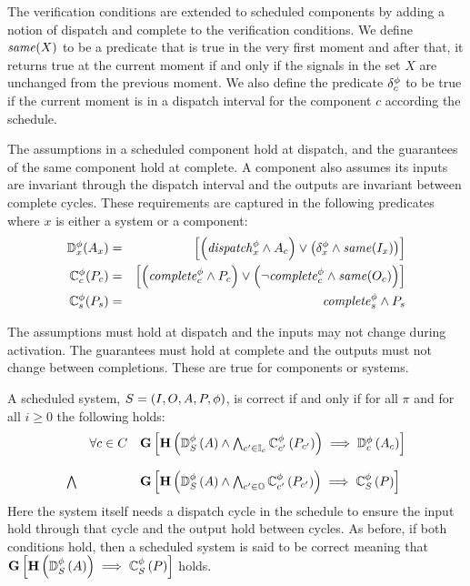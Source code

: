 The verification conditions are extended to scheduled components by adding a notion of dispatch and complete to the verification conditions.
We define $\mathit{same}(X)$ to be a predicate that is true in the very first moment and after that, it returns true at the current moment if and only if the signals in the set $X$ are unchanged from the previous moment.
We also define the predicate $\delta^\phi_c$ to be true if the current moment is in a dispatch interval for the component $c$ according the schedule.

The assumptions in a scheduled component hold at dispatch, and the guarantees of the same component hold at complete.
A component also assumes its inputs are invariant through the dispatch interval and the outputs are invariant between complete cycles.
These requirements are captured in the following predicates where $x$ is either a system or a component:
\begin{eqnarray*}
  \mathbb{D}^\phi_x(A_x) &=& \left[\left(\mathit{dispatch}^{\phi}_x \wedge A_c\right) \vee \left(\delta^\phi_x \wedge \mathit{same}(I_x)\right)\right] \\
  \mathbb{C}^\phi_c(P_c) &=& \left[\left(\mathit{complete}^{\phi}_c \wedge P_c\right) \vee \left(\neg\mathit{complete}^{\phi}_c \wedge \mathit{same}(O_c)\right)\right] \\
  \mathbb{C}^\phi_s(P_s) &=& \mathit{complete}^{\phi}_s \wedge P_s
\end{eqnarray*}

The assumptions must hold at dispatch and the inputs may not change during activation.
The guarantees must hold at complete and the outputs must not change between completions.
These are true for components or systems.

A scheduled system, $S = (I, O, A, P, \phi)$, is correct if and only if for all $\pi$ and for all $i \ge 0$ the following holds:
\[
\begin{array}{lll}
        & \forall c \in C &  
            \mathbf{G}\left[\mathbf{H}\left(\mathbb{D}^\phi_S\left(A\right) \wedge 
            \bigwedge_{c^\prime \in \mathbb{I}_c} \mathbb{C}^\phi_{c^\prime}\left(P_{c^\prime}\right)\right) 
            \implies \mathbb{D}^\phi_c\left(A_c\right)\right] \\ \\
 \bigwedge &   & 
            \mathbf{G}\left[\mathbf{H}\left(\mathbb{D}^\phi_S\left(A\right) \wedge 
            \bigwedge_{c^\prime \in \mathbb{O}} \mathbb{C}^\phi_{c^\prime}\left(P_{c^\prime}\right)\right)
            \implies \mathbb{C}^\phi_{S}\left(P\right)\right]
\end{array}
\]
Here the system itself needs a dispatch cycle in the schedule to ensure the input hold through that cycle and the output hold between cycles. As before, if both conditions hold, then a scheduled system is said to be correct meaning that $\mathbf{G}\left[\mathbf{H}\left(\mathbb{D}^\phi_S\left(A\right)\right) 
\implies \mathbb{C}^\phi_{S}\left(P\right)\right]$ holds.
